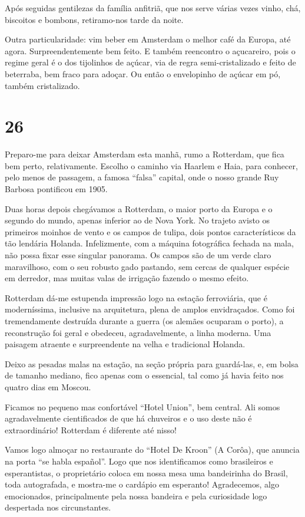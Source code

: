 Após seguidas gentilezas da família anfitriã, que nos serve várias vezes vinho, chá, biscoitos e bombons, retiramo-nos tarde da noite.

Outra particularidade: vim beber em Amsterdam o melhor café da Europa, até agora. Surpreendentemente bem feito. E também reencontro o açucareiro, pois o regime geral é o dos tijolinhos de açúcar, via de regra semi-cristalizado e feito de beterraba, bem fraco para adoçar. Ou então o envelopinho de açúcar em pó, também cristalizado.

\section*{26 \adfflatleafright {}}
Preparo-me para deixar Amsterdam esta manhã, rumo a Rotterdam, que fica bem perto, relativamente. Escolho o caminho via Haarlem e Haia, para conhecer, pelo menos de passagem, a famosa ``falsa'' capital, onde o nosso grande Ruy Barbosa pontificou em 1905.

Duas horas depois chegávamos a Rotterdam, o maior porto da Europa e o segundo do mundo, apenas inferior ao de Nova York. No trajeto avisto os primeiros moinhos de vento e os campos de tulipa, dois pontos característicos da tão lendária Holanda. Infelizmente, com a máquina fotográfica fechada na mala, não possa fixar esse singular panorama. Os campos são de um verde claro maravilhoso, com o seu robusto gado pastando, sem cercas de qualquer espécie em derredor, mas muitas valas de irrigação fazendo o mesmo efeito.

Rotterdam dá-me estupenda impressão logo na estação ferroviária, que é moderníssima, inclusive na arquitetura, plena de amplos envidraçados. Como foi tremendamente destruída durante a guerra (os alemães ocuparam o porto), a reconstrução foi geral e obedeceu, agradavelmente, a linha moderna. Uma paisagem atraente e surpreendente na velha e tradicional Holanda.

Deixo as pesadas malas na estação, na seção própria para guardá-las, e, em bolsa de tamanho mediano, fico apenas com o essencial, tal como já havia feito nos quatro dias em Moscou.

Ficamos no pequeno mas confortável ``Hotel Union'', bem central. Ali somos agradavelmente cientificados de que há chuveiros e o uso deste não é extraordinário! Rotterdam é diferente até nisso!

Vamos logo almoçar no restaurante do ``Hotel De Kroon'' (A Corôa), que anuncia na porta ``se habla español''. Logo que nos identificamos como brasileiros e esperantistas, o proprietário coloca em nossa mesa uma bandeirinha do Brasil, toda autografada, e mostra-me o cardápio em esperanto! Agradecemos, algo emocionados, principalmente pela nossa bandeira e pela curiosidade logo despertada nos circunstantes.

